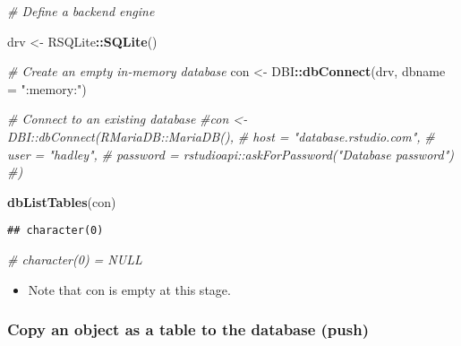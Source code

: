\documentclass[
]{book}
\newenvironment{Shaded}{\begin{snugshade}}{\end{snugshade}}
\newcommand{\CommentTok}[1]{\textcolor[rgb]{0.56,0.35,0.01}{\textit{#1}}}
\newcommand{\DataTypeTok}[1]{\textcolor[rgb]{0.13,0.29,0.53}{#1}}
\newcommand{\KeywordTok}[1]{\textcolor[rgb]{0.13,0.29,0.53}{\textbf{#1}}}
\newcommand{\NormalTok}[1]{#1}
\newcommand{\OperatorTok}[1]{\textcolor[rgb]{0.81,0.36,0.00}{\textbf{#1}}}
\newcommand{\StringTok}[1]{\textcolor[rgb]{0.31,0.60,0.02}{#1}}
\providecommand{\tightlist}{%
  \setlength{\itemsep}{0pt}\setlength{\parskip}{0pt}}
\begin{document}
\begin{Shaded}
\begin{Highlighting}[]
\CommentTok{\# Define a backend engine }

\NormalTok{drv \textless{}{-}}\StringTok{ }\NormalTok{RSQLite}\OperatorTok{::}\KeywordTok{SQLite}\NormalTok{()}

\CommentTok{\# Create an empty in{-}memory database }
\NormalTok{con \textless{}{-}}\StringTok{ }\NormalTok{DBI}\OperatorTok{::}\KeywordTok{dbConnect}\NormalTok{(drv, }
                      \DataTypeTok{dbname =} \StringTok{":memory:"}\NormalTok{)}

\CommentTok{\# Connect to an existing database }
\CommentTok{\#con \textless{}{-} DBI::dbConnect(RMariaDB::MariaDB(), }
 \CommentTok{\# host = "database.rstudio.com",}
 \CommentTok{\# user = "hadley",}
 \CommentTok{\# password = rstudioapi::askForPassword("Database password")}
\CommentTok{\#)}

\KeywordTok{dbListTables}\NormalTok{(con)}
\end{Highlighting}
\end{Shaded}

\begin{verbatim}
## character(0)
\end{verbatim}

\begin{Shaded}
\begin{Highlighting}[]
\CommentTok{\# character(0) = NULL}
\end{Highlighting}
\end{Shaded}

\begin{itemize}
\tightlist
\item
  Note that con is empty at this stage.
\end{itemize}

\hypertarget{copy-an-object-as-a-table-to-the-database-push}{%
\subsubsection{Copy an object as a table to the database (push)}\label{copy-an-object-as-a-table-to-the-database-push}}
\end{document}
